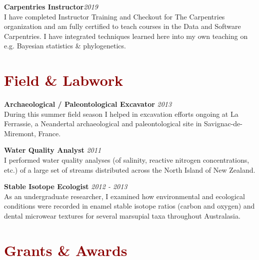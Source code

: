 \documentclass[11pt,margin,line]{resume}
\begin{document}
\begin{resume}
\textbf{Carpentries Instructor}\hfill \emph{2019}\\
I have completed Instructor Training and Checkout for The Carpentries organization and am fully certified to teach courses in the Data and Software Carpentries. I have integrated techniques learned here into my own teaching on e.g. Bayesian statistics \& phylogenetics.
\vspace{-1.5mm}

\section{\large\textcolor{DarkRed}{Field \& Labwork}}

\textbf{Archaeological / Paleontological Excavator} \hfill \emph{2013}\\
During this summer field season I helped in excavation efforts ongoing at La Ferrassie, a Neandertal archaeological and paleontological site in Savignac-de-Miremont, France.
\vspace{-1.5mm}

\textbf{Water Quality Analyst} \hfill \emph{2011}\\
I performed water quality analyses (of salinity, reactive nitrogen concentrations, etc.) of a large set of streams distributed across the North Island of New Zealand.
\vspace{-1.5mm}

\textbf{Stable Isotope Ecologist} \hfill \emph{2012 - 2013}\\
As an undergraduate researcher, I examined how environmental and ecological conditions were recorded in enamel stable isotope ratios (carbon and oxygen) and dental microwear textures for several marsupial taxa throughout Australasia.
\vspace{-1.5mm}

\section{\large\textcolor{DarkRed}{Grants \& Awards}}


\end{resume}
\end{document}
